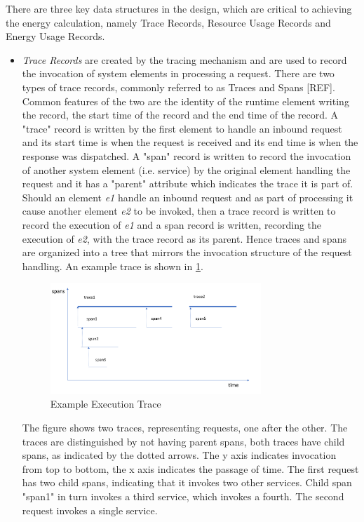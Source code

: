 There are three key data structures in the design, which are critical to achieving the energy calculation, namely Trace Records, Resource Usage Records and Energy Usage Records.

\begin{itemize}

\item \emph{Trace Records} are created by the tracing mechanism and are used to record the invocation of system elements in processing a request.  There are two types of trace records, commonly referred to as Traces and Spans [REF].  Common features of the two are the identity of the runtime element writing the record, the start time of the record and the end time of the record.  A "trace" record is written by the first element to handle an inbound request and its start time is when the request is received and its end time is when the response was dispatched.  A "span" record is written to record the invocation of another system element (i.e. service) by the original element handling the request and it has a "parent" attribute which indicates the trace it is part of.  Should an element \emph{e1} handle an inbound request and as part of processing it cause another element \emph{e2} to be invoked, then a trace record is written to record the execution of \emph{e1} and a span record is written, recording the execution of \emph{e2}, with the trace record as its parent.  Hence traces and spans are organized into a tree that mirrors the invocation structure of the request handling.  An example trace is shown in \ref{figure:span}.

\begin{figure}
\centering
\includegraphics[width=0.75\textwidth]{Figures/estimating-energy-trace}
\caption{Example Execution Trace}
\label{figure:span}
\end{figure}

The figure shows two traces, representing requests, one after the other.  The traces are distinguished by not having parent spans, both traces have child spans, as indicated by the dotted arrows.  The y axis indicates invocation from top to bottom, the x axis indicates the passage of time.  The first request has two child spans, indicating that it invokes two other services.  Child span "span1" in turn invokes a third service, which invokes a fourth.  The second request invokes a single service.


\end{itemize}
